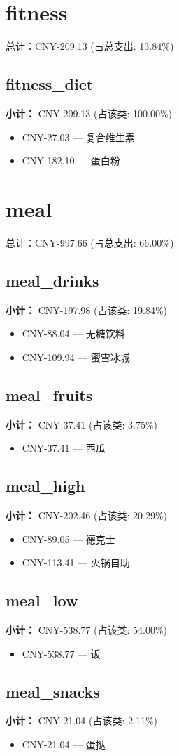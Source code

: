 \documentclass[12pt]{article}
\begin{document}
\section*{fitness}
总计：CNY-209.13 	 (占总支出: 13.84\%)

\subsection*{fitness\_diet}
\textbf{小计：} CNY-209.13 (占该类: 100.00\%)
\begin{itemize}
    \item CNY-27.03 --- 复合维生素
    \item CNY-182.10 --- 蛋白粉
\end{itemize}
\section*{meal}
总计：CNY-997.66 	 (占总支出: 66.00\%)

\subsection*{meal\_drinks}
\textbf{小计：} CNY-197.98 (占该类: 19.84\%)
\begin{itemize}
    \item CNY-88.04 --- 无糖饮料
    \item CNY-109.94 --- 蜜雪冰城
\end{itemize}
\subsection*{meal\_fruits}
\textbf{小计：} CNY-37.41 (占该类: 3.75\%)
\begin{itemize}
    \item CNY-37.41 --- 西瓜
\end{itemize}
\subsection*{meal\_high}
\textbf{小计：} CNY-202.46 (占该类: 20.29\%)
\begin{itemize}
    \item CNY-89.05 --- 德克士
    \item CNY-113.41 --- 火锅自助
\end{itemize}
\subsection*{meal\_low}
\textbf{小计：} CNY-538.77 (占该类: 54.00\%)
\begin{itemize}
    \item CNY-538.77 --- 饭
\end{itemize}
\subsection*{meal\_snacks}
\textbf{小计：} CNY-21.04 (占该类: 2.11\%)
\begin{itemize}
    \item CNY-21.04 --- 蛋挞
\end{itemize}
\end{document}
